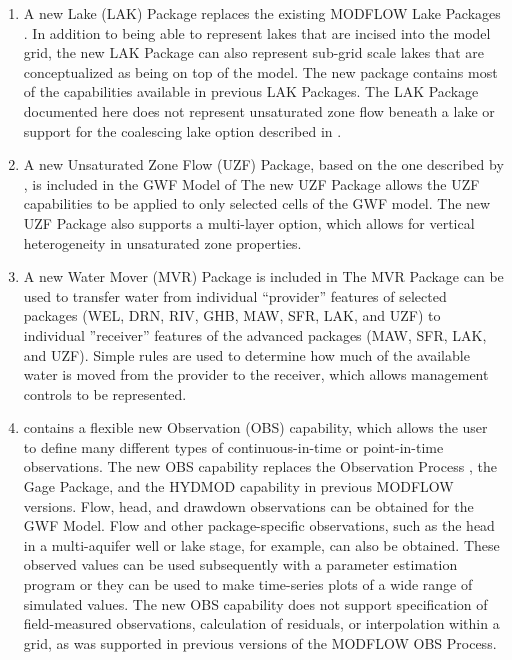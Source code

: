 \begin{enumerate}
\item A new Lake (LAK) Package replaces the existing MODFLOW Lake Packages \citep{modflowlak3pack}. In addition to being able to represent lakes that are incised into the model grid, the new LAK Package can also represent sub-grid scale lakes that are conceptualized as being on top of the model.  The new package contains most of the capabilities available in previous LAK Packages.  The LAK Package documented here does not represent unsaturated zone flow beneath a lake or support for the coalescing lake option described in \cite{modflowlak3pack}. 

\item A new Unsaturated Zone Flow (UZF) Package, based on the one described by \cite{UZF}, is included in the GWF Model of \mfdot The new UZF Package allows the UZF capabilities to be applied to only selected cells of the GWF model. The new UZF Package also supports a multi-layer option, which allows for vertical heterogeneity in unsaturated zone properties.

\item A new Water Mover (MVR) Package is included in \mfdot  The MVR Package can be used to transfer water from individual ``provider'' features of selected packages (WEL, DRN, RIV, GHB, MAW, SFR, LAK, and UZF) to individual ''receiver'' features of the advanced packages (MAW, SFR, LAK, and UZF).  Simple rules are used to determine how much of the available water is moved from the provider to the receiver, which allows management controls to be represented. 

\item \mf contains a flexible new Observation (OBS) capability, which allows the user to define many different types of continuous-in-time or point-in-time observations.  The new OBS capability replaces the Observation Process \citep{hill2000modflow}, the Gage Package, and the HYDMOD capability \citep{hanson1999documentation} in previous MODFLOW versions.  Flow, head, and drawdown observations can be obtained for the GWF Model.  Flow and other package-specific observations, such as the head in a multi-aquifer well or lake stage, for example, can also be obtained.  These observed values can be used subsequently with a parameter estimation program or they can be used to make time-series plots of a wide range of simulated values.  The new OBS capability does not support specification of field-measured observations, calculation of residuals, or interpolation within a grid, as was supported in previous versions of the MODFLOW OBS Process.


\end{enumerate}
